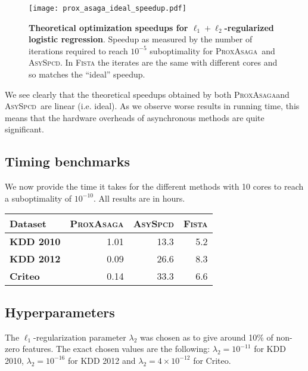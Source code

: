 \documentclass{article}
\newcommand{\PASAGA}{\textsc{ProxAsaga}}
\newcommand{\AsySPCD}{\textsc{AsySpcd}}
\begin{document}
\begin{figure}[h]
	\texttt{[image: prox\_asaga\_ideal\_speedup.pdf]}	
	\caption{{\bfseries Theoretical optimization speedups for $\ell_1 \!+\! \ell_2$-regularized logistic regression}. Speedup as measured by the number of iterations required to reach $10^{-5}$ suboptimality for \PASAGA\ and \AsySPCD. In \textsc{Fista} the iterates are the same with different cores and so matches the ``ideal'' speedup.
}\label{fig:ideal}
\end{figure}

We see clearly that the theoretical speedups obtained by both \PASAGA and \AsySPCD\ are linear (i.e. ideal).
As we observe worse results in running time, this means that the hardware overheads of asynchronous methods are quite significant.

\subsection{Timing benchmarks}\label{apx:timing_benchmarks}
We now provide the time it takes for the different methods with 10 cores to reach a suboptimality of $10^{-10}$. All results are in hours.
\begin{table}[h]
\centering
\begin{tabular}{lrrr}
\toprule
{\bfseries\sffamily Dataset} & \multicolumn{1}{c}{\PASAGA} & \multicolumn{1}{c}{\AsySPCD} & \textsc{Fista} \\
\midrule
{\bfseries\sffamily KDD 2010} & \hfill 1.01 & \hfill 13.3 & \hfill 5.2 \\
{\bfseries\sffamily KDD 2012} & \hfill 0.09 & \hfill 26.6 & \hfill 8.3 \\
{\bfseries\sffamily Criteo} &   \hfill 0.14 & \hfill 33.3 & \hfill 6.6 \\
\bottomrule
\end{tabular}
\end{table}

\subsection{Hyperparameters}
The $\ell_1$-regularization parameter $\lambda_2$ was chosen as to give around 10\% of non-zero features. The exact chosen values are the following: $\lambda_2 = 10^{-11}$ for KDD 2010, $\lambda_2 = 10^{-16}$ for KDD 2012 and $\lambda_2 = 4 \times 10^{-12}$ for Criteo.


%
%
%


\clearpage
\end{document}
